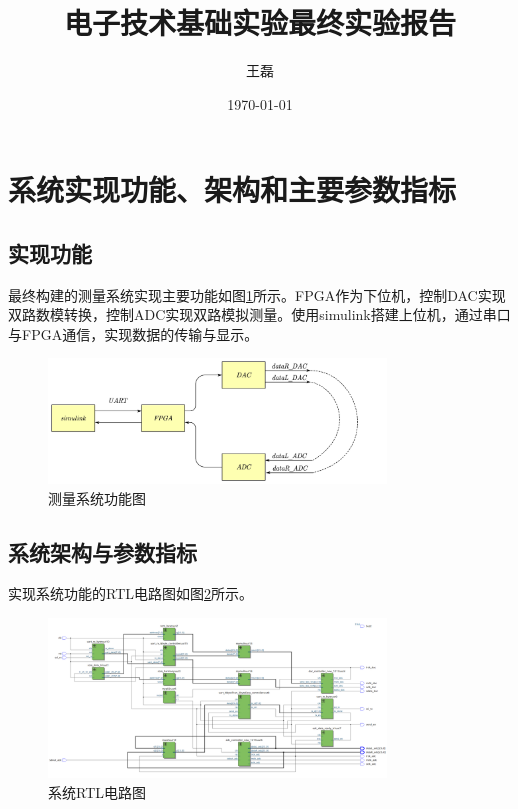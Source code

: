 \documentclass[UTF8]{ctexart}
\title{电子技术基础实验最终实验报告}
\author{王磊\quad2022012972}
\date{\today}
\begin{document}
\maketitle
\section{系统实现功能、架构和主要参数指标}
\subsection{实现功能}
最终构建的测量系统实现主要功能如图\ref{fig:system}所示。FPGA作为下位机，控制DAC实现双路数模转换，控制ADC实现双路模拟测量。使用simulink搭建上位机，通过串口与FPGA通信，实现数据的传输与显示。

\begin{figure}[!ht]
    \centering
    \includegraphics[width=0.8\textwidth]{system.png}
    \caption{测量系统功能图}
    \label{fig:system}
\end{figure}

\subsection{系统架构与参数指标}
实现系统功能的RTL电路图如图\ref{fig:rtl}所示。

\begin{figure}[!ht]
    \centering
    \includegraphics[width=0.8\textwidth]{rtl.png}
    \caption{系统RTL电路图}
    \label{fig:rtl}
\end{figure}
\end{document}
